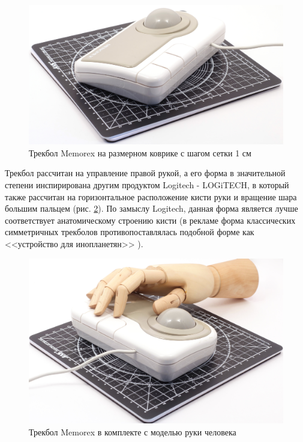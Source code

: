 \documentclass[11pt, a4paper]{article}
\begin{document}
\begin{figure}[h]
    \centering
    \includegraphics[scale=0.35]{1994_memorex_trackball/size_30.jpg}
    \caption{Трекбол Memorex на размерном коврике с шагом сетки 1 см}
    \label{fig:MemorexSize}
\end{figure}

Трекбол рассчитан на управление правой рукой, а его форма в значительной степени инспирирована другим продуктом Logitech - LOGiTECH, в который также рассчитан на горизонтальное расположение кисти руки и вращение шара большим пальцем (рис. \ref{fig:MemorexHand}). По замыслу Logitech, данная форма является лучше соответствует анатомическому строению кисти (в рекламе форма классических симметричных трекболов противопоставлялась подобной форме как <<устройство для инопланетян>> \cite{adv}).

\begin{figure}[h]
    \centering
    \includegraphics[scale=0.2]{1994_memorex_trackball/hand_30.jpg}
    \caption{Трекбол Memorex в комплекте с моделью руки человека}
    \label{fig:MemorexHand}
\end{figure}
\end{document}
